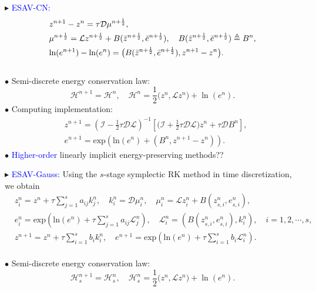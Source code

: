 \documentclass[10pt]{beamer}
\begin{document}
\begin{frame}
\textcolor[rgb]{0,0,1}{$\blacktriangleright$} \textcolor{blue}{ESAV-CN:}
\begin{align}\label{eq-38}
\aligned
&z^{n+1}-z^n=\tau\mathcal{D}\mu^{n+\frac{1}{2}},\\
&\mu^{n+\frac{1}{2}}=\mathcal{L}z^{n+\frac{1}{2}}+B(\bar{z}^{n+\frac{1}{2}},\bar{e}^{n+\frac{1}{2}}),\quad B(\bar{z}^{n+\frac{1}{2}},\bar{e}^{n+\frac{1}{2}})\triangleq B^n,\\
&\mbox{ln}(e^{n+1})-\mbox{ln}(e^n)=\big(B(\bar{z}^{n+\frac{1}{2}},\bar{e}^{n+\frac{1}{2}}),z^{n+1}-z^n\big).
\endaligned
\end{align}\\
\quad\textcolor[rgb]{0,0,1}{$\bullet$} Semi-discrete energy conservation law:
\begin{equation}\label{eq-39}
\mathcal{H}^{n+1}=\mathcal{H}^n,\quad\mathcal{H}^n=\frac{1}{2}\big(z^n,\mathcal{L}z^n\big)+\ln (e^n).
\end{equation} 
\quad\textcolor[rgb]{0,0,1}{$\bullet$} Computing implementation:
\begin{subequations}\label{eq-40}
\begin{align}
&z^{n+1}=\left(\mathcal{I}-\frac{1}{2}\tau\mathcal{D}\mathcal{L}\right)^{-1}\left[\big(\mathcal{I}+\frac{1}{2}\tau\mathcal{D}\mathcal{L}\big)z^n+\tau\mathcal{D}B^n\right],\label{eq-40-a}\\
&e^{n+1}=\mbox{exp}\left(\mbox{ln}(e^n)+(B^n,z^{n+1}-z^n)\right).\label{eq-40-b}
\end{align}
\end{subequations}  
\quad\textcolor[rgb]{0,0,1}{$\bullet$} \textcolor{blue}{Higher-order} linearly implicit energy-preserving methods??
\end{frame}

\begin{frame}
\textcolor[rgb]{0,0,1}{$\blacktriangleright$} \textcolor{blue}{ESAV-Gauss:}
Using the $s$-stage symplectic RK method in time discretization, we obtain
\begin{subequations}\label{eq-41}
\begin{align}
&z_i^n=z^n+\tau\sum_{j=1}^sa_{ij}k_j^n,\quad k_i^n=\mathcal{D}\mu_i^n,\quad \mu_i^n=\mathcal{L}z_i^n+B(z_{s,i}^n,e_{s,i}^n),\label{eq-41-a}\\
&e_i^n=\mbox{exp}\left(\mbox{ln}(e^n)+\tau\sum_{j=1}^sa_{ij}\mathcal{L}_j^n\right),\quad\mathcal{L}_i^n=\left(B(z_{s,i}^n,e_{s,i}^n),k_i^n\right),\quad i=1,2,\cdots,s,\label{eq-41-b}\\
&z^{n+1}=z^n+\tau\sum_{i=1}^sb_ik_i^n,\quad e^{n+1}=\mbox{exp}\left(\mbox{ln}(e^n)+\tau\sum_{i=1}^sb_i\mathcal{L}_i^n\right).\label{eq-41-c}
\end{align}
\end{subequations}\\
\quad\textcolor[rgb]{0,0,1}{$\bullet$} Semi-discrete energy conservation law:
\begin{equation}\label{eq-42}
\mathcal{H}_s^{n+1}=\mathcal{H}_s^n,\quad\mathcal{H}_s^n=\frac{1}{2}\big(z^n,\mathcal{L}z^n\big)+\ln (e^n).
\end{equation} 
\end{frame}
\end{document}
